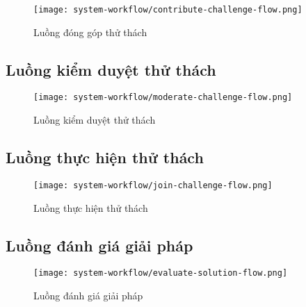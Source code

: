 \begin{figure}[H]
  \centering
  \texttt{[image: system-workflow/contribute-challenge-flow.png]}
  \caption{Luồng đóng góp thử thách}
  \label{fig:contribute-challenge-flow}
\end{figure}

\subsection{Luồng kiểm duyệt thử thách}

\begin{figure}[H]
  \centering
  \texttt{[image: system-workflow/moderate-challenge-flow.png]}
  \caption{Luồng kiểm duyệt thử thách}
  \label{fig:moderate-challenge-flow}
\end{figure}

\subsection{Luồng thực hiện thử thách}

\begin{figure}[H]
  \centering
  \texttt{[image: system-workflow/join-challenge-flow.png]}
  \caption{Luồng thực hiện thử thách}
  \label{fig:join-challenge-flow}
\end{figure}

\subsection{Luồng đánh giá giải pháp}

\begin{figure}[H]
  \centering
  \texttt{[image: system-workflow/evaluate-solution-flow.png]}
  \caption{Luồng đánh giá giải pháp}
  \label{fig:evaluate-solution-flow}
\end{figure}